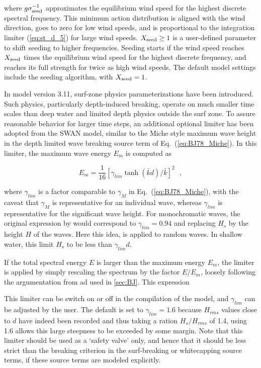 \noindent
where $g \sigma_{\rm seed}^{-1}$ approximates the equilibrium wind speed for
the highest discrete spectral frequency. This minimum action distribution is
aligned with the wind direction, goes to zero for low wind speeds, and is
proportional to the integration limiter (\ref{eq:st_d_5}) for large wind
speeds. $X_{\rm seed} \geq 1$ is a user-defined parameter to shift seeding to
higher frequencies. Seeding starts if the wind speed reaches $X_{\rm seed}$
times the equilibrium wind speed for the highest discrete frequency, and
reaches its full strength for twice as high wind speeds. The default model
settings include the seeding algorithm, with $X_{\rm seed} = 1$.

In model version 3.11, surf-zone physics parameterizations have been
introduced. Such physics, particularly depth-induced breaking, operate on much
smaller time scales than deep water and limited depth physics outside the surf
zone. To assure reasonable behavior for larger time steps, an additional
optional limiter has been adopted from the SWAN model, similar to the Miche
style maximum wave height in the depth limited wave breaking source term of
Eq.~(\ref{eq:BJ78_Miche}). In this limiter, the maximum wave energy $E_m$ is
computed as


\begin{equation}
E_m = \frac{1}{16} [ \gamma_{lim}  \tanh ( \bar{k} d ) / \bar{k} ] ^2
\:\:\: , \label{eq:MLIM} 
\end{equation}

\noindent
where $\gamma_{lim}$ is a factor comparable to $\gamma_M$ in
Eq.~(\ref{eq:BJ78_Miche}), with the caveat that $\gamma_M$ is representative
for an individual wave, whereas $\gamma_{lim}$ is representative for the
significant wave height. For monochromatic waves, the original expression by \cite{art:Miche44} would correspond to $\gamma_{lim} = 0.94$ and
replacing $H_s$ by the height $H$ of the waves. Here this idea, is applied to random waves. 
In shallow water, this limit $H_s$ to be less than $\gamma_{lim} d$. 

If the total spectral energy $E$ is larger than the
maximum energy $E_m$, the limiter is applied by simply rescaling the spectrum
by the factor $E/E_m$, loosely following the argumentation from
\cite{art:EB96} ad used in \para\ref{sec:BJ}. This expression 

This limiter can be switch on or off in the compilation of the model, and
$\gamma_{lim}$ can be adjusted by the user. The default is set to $\gamma_{lim} =
1.6$ because $H_{rms}$ values close to $d$ have indeed been recorded and thus taking a ration 
$H_s/H_{rms}$ of 1.4, using 1.6 allows this large steepness to be exceeded by some margin. 
Note that this limiter should be used as a `safety valve' only, and
hence that it should be less strict than the breaking criterion in the
surf-breaking or whitecapping source terms, if these source terms are modeled explicitly.

